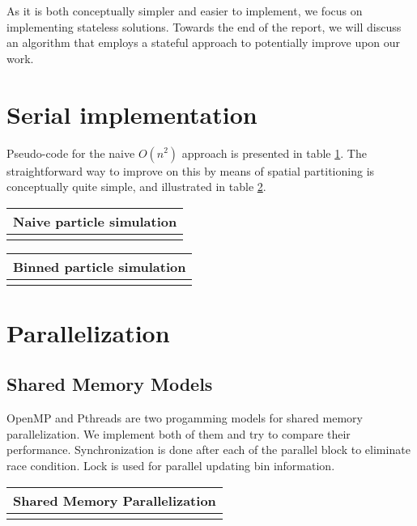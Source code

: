 \documentclass[11pt]{article}
\begin{document}
As it is both conceptually simpler and easier to implement, we focus on implementing stateless solutions. Towards the end of the report, we will discuss an algorithm that employs a stateful approach to potentially improve upon our work.

\section{Serial implementation}
Pseudo-code for the naive $O(n^2)$ approach is presented in table \ref{tab:naive}. The straightforward way to improve on this by means of spatial partitioning is conceptually quite simple, and illustrated in table \ref{tab:serial}.

\begin{table}[htb]
  \centering
  \begin{tabular}{l}
    \hline
      Naive particle simulation\\
    \hline
      \\
    \hline
  \end{tabular}
  \label{tab:naive}
\end{table}

\begin{table}[htb]
  \centering
  \begin{tabular}{l}
    \hline
      Binned particle simulation\\
    \hline
      \\
    \hline
  \end{tabular}
  \label{tab:serial}
\end{table}

\FloatBarrier

\section{Parallelization}
\subsection{Shared Memory Models}
OpenMP and Pthreads are two progamming models for shared memory parallelization. We implement both of them and try to 
compare their performance. Synchronization is done after each of the parallel block to eliminate race condition. Lock
is used for parallel updating bin information.

\begin{table}[htb]
  \centering
  \begin{tabular}{l}
    \hline
      Shared Memory Parallelization\\
    \hline
      \\
    \hline
  \end{tabular}
  \label{tab:shared_memory}
\end{table}
\end{document}
